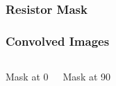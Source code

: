 \documentclass{beamer}
\begin{document}

\begin{frame}
\frametitle{Resistor Mask}
\begin{center}
\end{center}
\end{frame}


\begin{frame}
\frametitle{Convolved Images}
\begin{columns}[c]
  \column{2in}
  	\begin{center}
  	Mask at 0\degree
  	\end{center}
  \column{2in}
    \begin{center}
  	Mask at 90\degree
  	\end{center}
\end{columns}
\end{frame}
\end{document}
